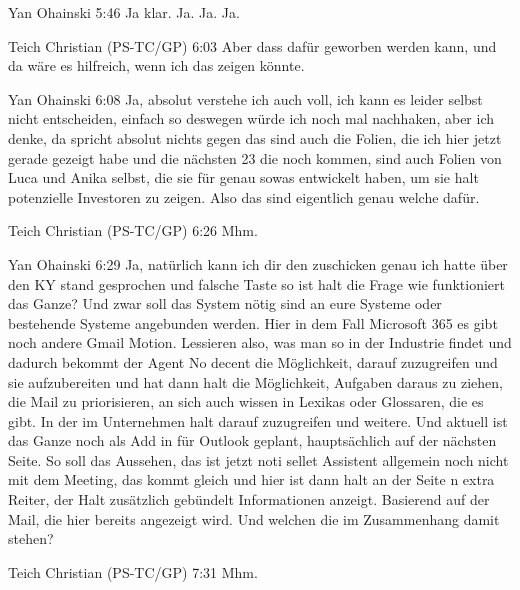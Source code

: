 Yan Ohainski   5:46
Ja klar.
Ja.
Ja.
Ja.

Teich Christian (PS-TC/GP)   6:03
Aber dass dafür geworben werden kann, und da wäre es hilfreich, wenn ich das zeigen könnte.

Yan Ohainski   6:08
Ja, absolut verstehe ich auch voll, ich kann es leider selbst nicht entscheiden, einfach so deswegen würde ich noch mal nachhaken, aber ich denke, da spricht absolut nichts gegen das sind auch die Folien, die ich hier jetzt gerade gezeigt habe und die nächsten 23 die noch kommen, sind auch Folien von Luca und Anika selbst, die sie für genau sowas entwickelt haben, um sie halt potenzielle Investoren zu zeigen. Also das sind eigentlich genau welche dafür.

Teich Christian (PS-TC/GP)   6:26
Mhm.

Yan Ohainski   6:29
Ja, natürlich kann ich dir den zuschicken genau ich hatte über den KY stand gesprochen und falsche Taste so ist halt die Frage wie funktioniert das Ganze? Und zwar soll das System nötig sind an eure Systeme oder bestehende Systeme angebunden werden. Hier in dem Fall Microsoft 365 es gibt noch andere Gmail Motion.
Lessieren also, was man so in der Industrie findet und dadurch bekommt der Agent No decent die Möglichkeit, darauf zuzugreifen und sie aufzubereiten und hat dann halt die Möglichkeit, Aufgaben daraus zu ziehen, die Mail zu priorisieren, an sich auch wissen in Lexikas oder Glossaren, die es gibt. In der im Unternehmen halt darauf zuzugreifen und weitere.
Und aktuell ist das Ganze noch als Add in für Outlook geplant, hauptsächlich auf der nächsten Seite. So soll das Aussehen, das ist jetzt noti sellet Assistent allgemein noch nicht mit dem Meeting, das kommt gleich und hier ist dann halt an der Seite n extra Reiter, der Halt zusätzlich gebündelt Informationen anzeigt. Basierend auf der Mail, die hier bereits angezeigt wird.
Und welchen die im Zusammenhang damit stehen?

Teich Christian (PS-TC/GP)   7:31
Mhm.

